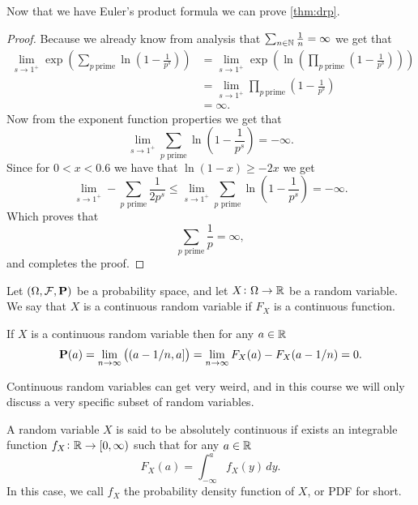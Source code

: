 \documentclass[11pt,a4paper]{article}
\begin{document}
  Now that we have Euler's product formula we can prove \autoref{thm:drp}.
  \begin{proof}
    Because we already know from analysis that 
    $\sum_{n \in \mathbb{N}} \frac 1n = \infty$ we get that
    \begin{align*}
      \lim_{s \to 1^+}
      \exp\left(\sum_{p \ \mathrm{prime}}
      \ln \left(1 - \frac{1}{p^{s}}\right)\right) &=
      \lim_{s \to 1^+}
      \exp \left(\ln\left(\prod_{p \ \mathrm{prime}}
      \left(1 - \frac{1}{p^{s}}\right)\right)\right) \\ &= 
      \lim_{s \to 1^+} 
      \prod_{p \ \mathrm{prime}} \left(1 - \frac{1}{p^{s}}\right) \\ &= 
      \infty.
    \end{align*}
    Now from the exponent function properties we get that
    \[
      \lim_{s \to 1^+} 
      \sum_{p \text{ prime}} \ln\left(1 - \frac{1}{p^{s}}\right) =
      - \infty.
    \]
    Since for $0 < x < 0.6$ we have that $\ln(1-x) \geq -2x$ we get
    \[
      \lim_{s \to 1^+}
      - \sum_{p \text{ prime}} \frac{1}{2 p^s} \le
      \lim_{s \to 1^+}
      \sum_{p \text{ prime}} \ln\left(1 - \frac{1}{p^{s}}\right) =
      - \infty.
    \]
    Which proves that
    \[
      \sum_{p \text{ prime}} \frac{1}{p} = \infty,
    \]
    and completes the proof.
  \end{proof}

  \begin{definition}
    Let $(\Omega, \mathcal F, \mathbf{P})$ be a probability space,
    and let $X \colon \Omega \to \mathbb{R}$ be a random variable.
    We say that $X$ is a continuous random variable if $F_X$ is a
    continuous function.
  \end{definition}
  \begin{remark}
    If $X$ is a continuous random variable then for any $a \in \mathbb{R}$
    \[
      \mathbf{P}(a) = 
      \lim_{n \to \infty}\left((a - 1/n, a]\right) =
      \lim_{n \to \infty} F_X(a) - F_X(a - 1/n) =
      0.
    \]
  \end{remark}
  
  Continuous random variables can get very weird, and in this course we
  will only discuss a very specific subset of random variables.

  \begin{definition}
    A random variable $X$ is said to be absolutely continuous if exists an
    integrable function $f_X \colon \mathbb{R} \to [0,\infty)$ such that for any
    $a \in \mathbb{R}$
    \[
      F_X(a) = \int_{-\infty}^{a} f_X(y)\,dy.
    \]
    In this case, we call $f_X$ the probability density function of $X$,
    or PDF for short.
  \end{definition}
  
\end{document}
